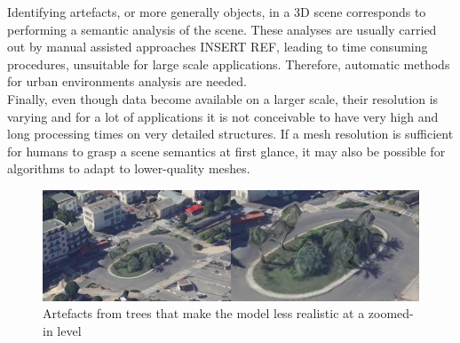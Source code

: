 \documentclass{kththesis}
\begin{document}
Identifying artefacts, or more generally objects, in a 3D scene corresponds to performing a semantic analysis of the scene. These analyses are usually carried out by manual assisted approaches INSERT REF, leading to
time consuming procedures, unsuitable for large scale applications. Therefore, automatic methods for urban environments analysis are needed. \\
Finally, even though data become available on a larger scale, their resolution is varying and for a lot of applications it is not conceivable to have very high and long processing times on very detailed structures. If a mesh resolution is sufficient for humans to grasp a scene semantics at first glance, it  may also be possible for algorithms to adapt to lower-quality meshes. 

\begin{figure}[H]
    \centering
    \includegraphics[width=\textwidth]{images/Stadsmiljo.png}
    \caption{Artefacts from trees that make the model less realistic at a zoomed-in level}
    \label{fig:stadsmiljo}
\end{figure}
\end{document}
